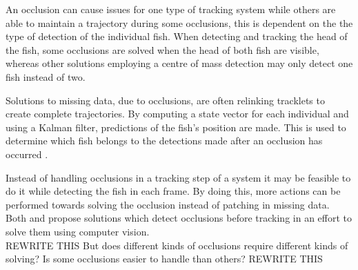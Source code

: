 An occlusion can cause issues for one type of tracking system while others are able to maintain a trajectory during some occlusions, this is dependent on the the type of detection of the individual fish. When detecting and tracking the head of the fish, some occlusions are solved when the head of both fish are visible, whereas other solutions employing a centre of mass detection may only detect one fish instead of two.

Solutions to missing data, due to occlusions, are often relinking tracklets to create complete trajectories. By computing a state vector for each individual and using a Kalman filter, predictions of the fish’s position are made. This is used to determine which fish belongs to the detections made after an occlusion has occurred \citep{Feijo2018, Qian2014}. 

Instead of handling occlusions in a tracking step of a system it may be feasible to do it while detecting the fish in each frame. By doing this, more actions can be performed towards solving the occlusion instead of patching in missing data. Both \cite{Romero-Ferrero2019} and \cite{Dolado2015} propose solutions which detect occlusions before tracking in an effort to solve them using computer vision.\\

REWRITE THIS
But does different kinds of occlusions require different kinds of solving? Is some occlusions easier to handle than others?
REWRITE THIS


